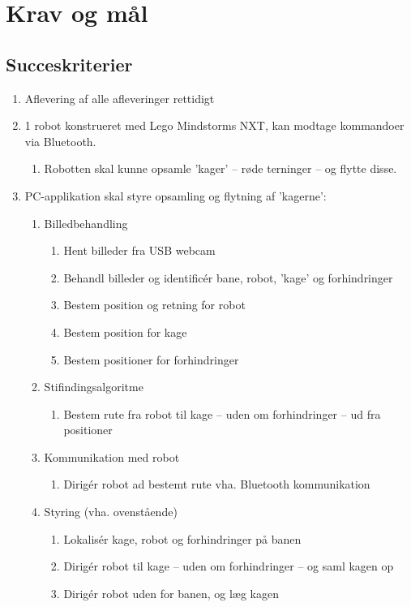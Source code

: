 \section{Krav og mål}
\subsection{Succeskriterier}
\begin{enumerate}
	\item Aflevering af alle afleveringer rettidigt
	\item 1 robot konstrueret med Lego Mindstorms NXT, kan modtage kommandoer via Bluetooth.
	\begin{enumerate}
		\item Robotten skal kunne opsamle 'kager' -- røde terninger -- og flytte disse.
	\end{enumerate}
	\item PC-applikation skal styre opsamling og flytning af 'kagerne':
	\begin{enumerate}
		\item Billedbehandling
		\begin{enumerate}
			\item Hent billeder fra USB webcam
			\item Behandl billeder og identificér bane, robot, 'kage' og forhindringer
			\item Bestem position og retning for robot
			\item Bestem position for kage
			\item Bestem positioner for forhindringer
		\end{enumerate}
		\item Stifindingsalgoritme
		\begin{enumerate}
			\item Bestem rute fra robot til kage -- uden om forhindringer -- ud fra positioner
		\end{enumerate}
		\item Kommunikation med robot
		\begin{enumerate}
			\item Dirigér robot ad bestemt rute vha. Bluetooth kommunikation
		\end{enumerate}
		\item Styring (vha. ovenstående)
		\begin{enumerate}
			\item Lokalisér kage, robot og forhindringer på banen
			\item Dirigér robot til kage -- uden om forhindringer -- og saml kagen op
			\item Dirigér robot uden for banen, og læg kagen
		\end{enumerate}
	\end{enumerate}
\end{enumerate}

